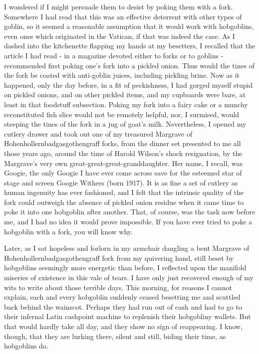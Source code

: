 I wondered if I might persuade them to desist by poking them with a fork. Somewhere I had read that this was an effective deterrent with other types of goblin, so it seemed a reasonable assumption that it would work with hobgoblins, even ones which originated in the Vatican, if that was indeed the case. As I dashed into the kitchenette flapping my hands at my besetters, I recalled that the article I had read - in a magazine devoted either to forks or to goblins - recommended first poking one's fork into a pickled onion. Thus would the tines of the fork be coated with anti-goblin juices, including pickling brine. Now as it happened, only the day before, in a fit of peckishness, I had gorged myself stupid on pickled onions, and on other pickled items, and my cupboards were bare, at least in that foodstuff subsection. Poking my fork into a fairy cake or a munchy reconstituted fish slice would not be remotely helpful, nor, I surmised, would steeping the tines of the fork in a jug of goat's milk. Nevertheless, I opened my cutlery drawer and took out one of my treasured Margrave of Hohenhollernbadgasgothengraff forks, from the dinner set presented to me all those years ago, around the time of Harold Wilson's shock resignation, by the Margrave's very own great-great-great-granddaughter. Her name, I recall, was Googie, the only Googie I have ever come across save for the esteemed star of stage and screen Googie Withers (born 1917). It is as fine a set of cutlery as human ingenuity has ever fashioned, and I felt that the intrinsic quality of the fork could outweigh the absence of pickled onion residue when it came time to poke it into one hobgoblin after another. That, of course, was the task now before me, and I had no idea it would prove impossible. If you have ever tried to poke a hobgoblin with a fork, you will know why.

Later, as I sat hopeless and forlorn in my armchair dangling a bent Margrave of Hohenhollernbadgasgothengraff fork from my quivering hand, still beset by hobgoblins seemingly more energetic than before, I reflected upon the manifold miseries of existence in this vale of tears. I have only just recovered enough of my wits to write about those terrible days. This morning, for reasons I cannot explain, each and every hobgoblin suddenly ceased besetting me and scuttled back behind the wainscot. Perhaps they had run out of cash and had to go to their infernal Latin cashpoint machine to replenish their hobgobliny wallets. But that would hardly take all day, and they show no sign of reappearing. I know, though, that they are lurking there, silent and still, biding their time, as hobgoblins do.